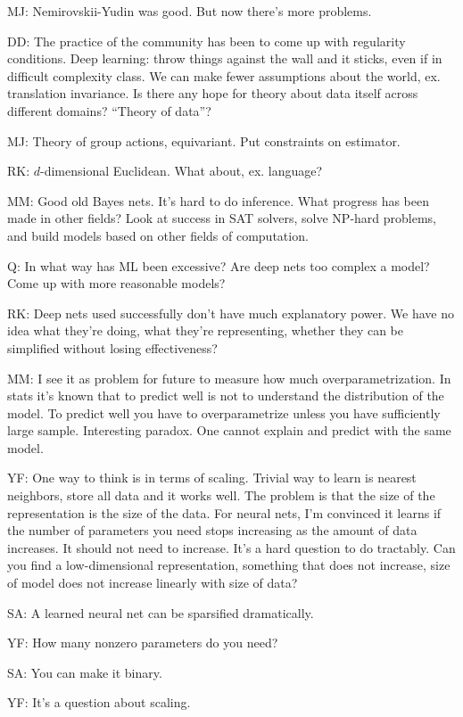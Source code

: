 MJ: Nemirovskii-Yudin was good. But now there's more problems. 

DD: The practice of the community has been to come up with regularity conditions.  Deep learning: throw things against the wall and it sticks, even if in difficult complexity class. We can make fewer assumptions about the world, ex. translation invariance. Is there any hope for theory about data itself across different domains? ``Theory of data''? 

MJ: Theory of group actions, equivariant. Put constraints on estimator.

RK: $d$-dimensional Euclidean. What about, ex. language?

MM: Good old Bayes nets. It's hard to do inference.  What progress has been made in other fields?  Look at success in SAT solvers, solve NP-hard problems, and build models based on other fields of computation. 

Q: In what way has ML been excessive? Are deep nets too complex a model? Come up with more reasonable models?

RK: Deep nets used successfully don't have much explanatory power. We have no idea what they're doing, what they're representing, whether they can be simplified without losing effectiveness?

MM: I see it as problem for future to measure how much overparametrization. In stats it's known that to predict well is not to understand the distribution of the model. To predict well you have to overparametrize unless you have sufficiently large sample. Interesting paradox. One cannot explain and predict with the same model.

YF: One way to think is in terms of scaling. Trivial way to learn is nearest neighbors, store all data and it works well. The problem is that the size of the representation  is the size of the data. For neural nets, I'm convinced it learns if the number of parameters you need stops increasing as the amount of data increases. It should not need to increase. It's a hard question to do tractably. 
Can you find a low-dimensional representation, something that does not increase, size of model does not increase linearly with size of data?

SA: A learned neural net can be sparsified dramatically.

YF: How many nonzero parameters do you need?

SA: You can make it binary.

YF: It's a question about scaling.

